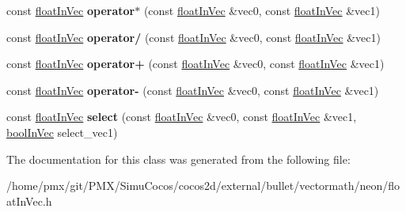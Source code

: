 \begin{DoxyCompactItemize}
const \hyperlink{classVectormath_1_1floatInVec}{float\+In\+Vec} {\bfseries operator$\ast$} (const \hyperlink{classVectormath_1_1floatInVec}{float\+In\+Vec} \&vec0, const \hyperlink{classVectormath_1_1floatInVec}{float\+In\+Vec} \&vec1)
\item 
\mbox{\label{classVectormath_1_1floatInVec_a45e96ad304260d908bfc6d2b51b210d2}} 
const \hyperlink{classVectormath_1_1floatInVec}{float\+In\+Vec} {\bfseries operator/} (const \hyperlink{classVectormath_1_1floatInVec}{float\+In\+Vec} \&vec0, const \hyperlink{classVectormath_1_1floatInVec}{float\+In\+Vec} \&vec1)
\item 
\mbox{\label{classVectormath_1_1floatInVec_a9e67ab843002e647fa7bb2caed760bdc}} 
const \hyperlink{classVectormath_1_1floatInVec}{float\+In\+Vec} {\bfseries operator+} (const \hyperlink{classVectormath_1_1floatInVec}{float\+In\+Vec} \&vec0, const \hyperlink{classVectormath_1_1floatInVec}{float\+In\+Vec} \&vec1)
\item 
\mbox{\label{classVectormath_1_1floatInVec_ac6c858483e69952c29682d153854fbe2}} 
const \hyperlink{classVectormath_1_1floatInVec}{float\+In\+Vec} {\bfseries operator-\/} (const \hyperlink{classVectormath_1_1floatInVec}{float\+In\+Vec} \&vec0, const \hyperlink{classVectormath_1_1floatInVec}{float\+In\+Vec} \&vec1)
\item 
\mbox{\label{classVectormath_1_1floatInVec_a2970b847bee6dc51a58e7b308ab866c0}} 
const \hyperlink{classVectormath_1_1floatInVec}{float\+In\+Vec} {\bfseries select} (const \hyperlink{classVectormath_1_1floatInVec}{float\+In\+Vec} \&vec0, const \hyperlink{classVectormath_1_1floatInVec}{float\+In\+Vec} \&vec1, \hyperlink{classVectormath_1_1boolInVec}{bool\+In\+Vec} select\+\_\+vec1)
\end{DoxyCompactItemize}


The documentation for this class was generated from the following file\+:\begin{DoxyCompactItemize}
\item 
/home/pmx/git/\+P\+M\+X/\+Simu\+Cocos/cocos2d/external/bullet/vectormath/neon/float\+In\+Vec.\+h\end{DoxyCompactItemize}

